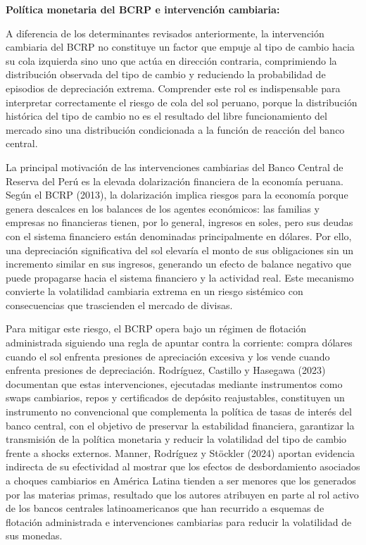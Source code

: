 ﻿\documentclass[11pt,a4paper]{article}
\begin{document}
\textbf{Política monetaria del BCRP e intervención cambiaria: }

A diferencia de los determinantes revisados anteriormente, la intervención cambiaria del BCRP no constituye un factor que empuje al tipo de cambio hacia su cola izquierda sino uno que actúa en dirección contraria, comprimiendo la distribución observada del tipo de cambio y reduciendo la probabilidad de episodios de depreciación extrema. Comprender este rol es indispensable para interpretar correctamente el riesgo de cola del sol peruano, porque la distribución histórica del tipo de cambio no es el resultado del libre funcionamiento del mercado sino una distribución condicionada a la función de reacción del banco central. 

La principal motivación de las intervenciones cambiarias del Banco Central de Reserva del Perú es la elevada dolarización financiera de la economía peruana. Según el BCRP (2013), la dolarización implica riesgos para la economía porque genera descalces en los balances de los agentes económicos: las familias y empresas no financieras tienen, por lo general, ingresos en soles, pero sus deudas con el sistema financiero están denominadas principalmente en dólares. Por ello, una depreciación significativa del sol elevaría el monto de sus obligaciones sin un incremento similar en sus ingresos, generando un efecto de balance negativo que puede propagarse hacia el sistema financiero y la actividad real. Este mecanismo convierte la volatilidad cambiaria extrema en un riesgo sistémico con consecuencias que trascienden el mercado de divisas.

Para mitigar este riesgo, el BCRP opera bajo un régimen de flotación administrada siguiendo una regla de apuntar contra la corriente: compra dólares cuando el sol enfrenta presiones de apreciación excesiva y los vende cuando enfrenta presiones de depreciación. Rodríguez, Castillo y Hasegawa (2023) documentan que estas intervenciones, ejecutadas mediante instrumentos como swaps cambiarios, repos y certificados de depósito reajustables, constituyen un instrumento no convencional que complementa la política de tasas de interés del banco central, con el objetivo de preservar la estabilidad financiera, garantizar la transmisión de la política monetaria y reducir la volatilidad del tipo de cambio frente a shocks externos. Manner, Rodríguez y Stöckler (2024) aportan evidencia indirecta de su efectividad al mostrar que los efectos de desbordamiento asociados a choques cambiarios en América Latina tienden a ser menores que los generados por las materias primas, resultado que los autores atribuyen en parte al rol activo de los bancos centrales latinoamericanos que han recurrido a esquemas de flotación administrada e intervenciones cambiarias para reducir la volatilidad de sus monedas.
\end{document}
